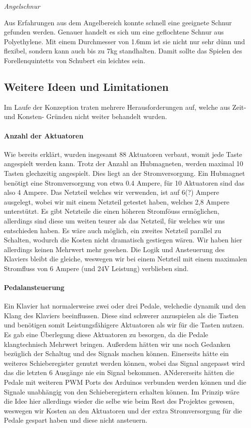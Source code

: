 \textit{Angelschnur}

Aus Erfahrungen aus dem Angelbereich konnte schnell eine geeignete Schnur gefunden werden.
Genauer handelt es sich um eine geflochtene Schnur aus Polyethylene.
Mit einem Durchmesser von 1.6mm ist sie nicht nur sehr dünn und flexibel, sondern kann auch bis zu 7kg standhalten.
Damit sollte das Spielen des Forellenquintetts von Schubert ein leichtes sein.



\subsection{Weitere Ideen und Limitationen}

Im Laufe der Konzeption traten mehrere Herausforderungen auf, welche aus Zeit- und Konsten- Gründen nicht weiter
behandelt wurden.
\paragraph{Anzahl der Aktuatoren}
Wie bereits erklärt, wurden insgesamt 88 Aktuatoren verbaut, womit jede Taste angespielt werden kann. Trotz der Anzahl an
Hubmagneten, werden maximal 10 Tasten glechzeitig angespielt. Dies liegt an der Stromversorgung. Ein Hubmagnet benötigt
eine Stromversorgung von etwa 0.4 Ampere, für 10 Aktuatoren sind das also 4 Ampere. Das Netzteil welches wir verwenden, ist auf
6(?) Ampere ausgelegt, wobei wir mit einem Netzteil getestet haben, welches 2,8 Ampere unterstützt. Es gibt Netzteile die
einen höheren Stromföuss ermöglichen, allerdings sind diese um weiten teurer als das Netzteil, für welches wir uns entschieden haben.
Es wäre auch möglich, ein zweites Netzteil parallel zu Schalten, wodurch die Kosten nicht dramatisch gestiegen wären.
Wir haben hier allerdings keinen Mehrwert mehr gesehen. Die Logik und Ansteuerung des Klaviers bleibt die gleiche, weswegen
wir bei einem Netzteil mit einem maximalen Stromfluss von 6 Ampere (und 24V Leistung) verblieben sind.

\paragraph{Pedalansteuerung}
Ein Klavier hat normalerweise zwei oder drei Pedale, welchedie dynamik und den Klang des Klaviers beeinflussen.
Diese sind schwerer anzuspielen als die Tasten und benötigen somit Leistungsfähigere Aktuatoren als wir für die
Tasten nutzen. Es gab eine Überlegung diese Aktuatoren zu besorgen, da die Pedale klangtechnisch Mehrwert bringen.
Außerdem hätten wir uns noch Gedanken bezüglich der Schaltug und des Signals machen können. Einerseits hätte ein weiteres
Schieberegister genutzt werden können, wobei das Signal angepasst wird das die letzten 6 Ausgänge nie ein Signal bekommen.
ANdererseits hätten die Pedale mit weiteren PWM Ports des Arduinos verbunden werden können und die Signale unabhängig von den
Schieberegistern erhalten können. Im Prinzip wäre die Idee hier allerdings wieder die selbe wie beim Rest des Projektes gewesen,
weswegen wir Kosten an den Aktuatoren und der extra Stromversorgung für die Pedale gespart haben und diese nicht ansteuern.

